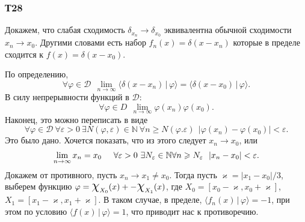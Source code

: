 \subsubsection*{Т28}

Докажем, что слабая сходимость $\delta_{x_n} \to \delta_{x_0}$ эквивалентна обычной сходимости $x_n \to x_0$. Другими словами есть набор $f_n (x) = \delta(x-x_n)$ которые в пределе сходится к $f(x) = \delta(x-x_0)$. 

По определению,
\begin{equation*}
    \forall \varphi \in \mathcal D \ \ 
    \lim_{n\to \infty} \langle \delta(x-x_n) \,|\, \varphi \rangle = \langle \delta(x-x_0) \,|\, \varphi \rangle.
\end{equation*}
В силу непрерывности функций в $\mathcal D$:
\begin{equation*}
    \forall \varphi \in D \ \ \lim_{n\to \infty}   \varphi(x_n) \varphi(x_0).
\end{equation*}
Наконец, это можно переписать в виде
\begin{equation*}
    \forall \varphi \in \mathcal D \ 
    \forall \varepsilon > 0 \ 
    \exists N(\varphi, \varepsilon) \in \mathbb{N} \ 
    \forall n \geq N(\varphi. \varepsilon) \ \ 
    |\varphi(x_n) - \varphi(x_0)| < \varepsilon.
\end{equation*}
Это было дано. Хочется показать, что из этого следует $x_n \to x_0$, или
\begin{equation*}
    \lim_{n\to \infty} x_n = x_0 
    \hspace{5 mm} 
    \forall \varepsilon > 0 \ 
    \exists N_\varepsilon \in \mathbb{N} \forall n \geq N_\varepsilon \ \ 
    |x_n - x_0| < \varepsilon.
\end{equation*}
Докажем от противного, пусть $x_n \to x_1 \neq x_0$. Тогда пусть $\varkappa = |x_1-x_0|/3$, выберем функцию $\varphi = \cf{X_0} (x)+ -\cf{X_1} (x)$,  где $X_0 = [x_0-\varkappa, x_0 + \varkappa]$, $X_1 = [x_1-\varkappa, x_1 + \varkappa]$. В таком случае, в пределе, $\langle f_n (x) \,|\, \varphi \rangle = -1$, при этом по условию $\langle f(x) \,|\, \varphi \rangle = 1$, что приводит нас к противоречию. 


